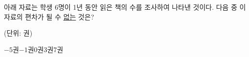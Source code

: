 아래 자료는 학생 6명이 1년 동안 읽은 책의 수를 조사하여 나타낸 것이다. 다음 중 이 자료의 편차가 될 수 \underline{없는} 것은?\par\noindent\hfill{\footnotesize (단위: 권)}
\begin{choices32}{$-5$권}{$-1$권}{$0$권}{$3$권}{$7$권}\end{choices32}
